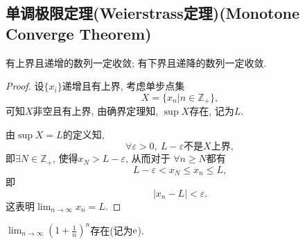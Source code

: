 \subsection[单调极限定理]{单调极限定理(Weierstrass定理)(Monotone Converge Theorem)}
\begin{theorem}[单调极限定理]
  有上界且递增的数列一定收敛; 有下界且递降的数列一定收敛.
\end{theorem}
\begin{proof}
  设$\{ x_i \}$递增且有上界, 考虑单步点集
  \begin{equation}
    X = \{ x_n | n\in \mathbb{Z}_{+} \},
  \end{equation}
  可知$X$非空且有上界, 由确界定理知, $\sup X$存在, 记为$L$.

  由$\sup X = L$的定义知,
  \begin{equation}
    \forall \varepsilon >0 ,\ L- \varepsilon \text{不是$X$上界},
  \end{equation}
  即$\exists  N\in \mathbb{Z}_{+}$, 使得$x_N > L-\varepsilon $, 从而对于
  $\forall n \ge  N$都有
  \begin{equation}
    L-\varepsilon < x_N \le  x_n \le  L,
  \end{equation}
  即
  \begin{equation}
    \left| x_n - L  \right| < \varepsilon.
  \end{equation}
  这表明$\displaystyle \lim_{n \to \infty}x_n = L$.
\end{proof}


\begin{theorem}[Euler]
    $\displaystyle \lim_{n \to \infty}\left( 1+\frac{1}{n} \right) ^{n}$存在(记为$\mathrm{e}^{}$).
\end{theorem}

